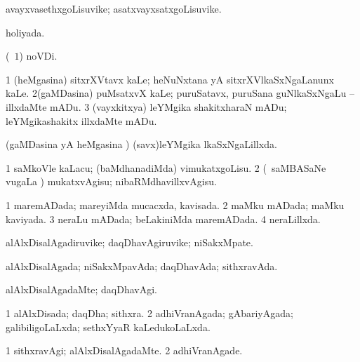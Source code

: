 {{\bentry
{} 
\gl{\nA}
\expl{}
\bmng
avayxvasethxgoLisuvike; asatxvayxsatxgoLisuvike. 
\emng
\eentry

\bentry
{} 
\gl{\gu}
\expl{}
\bmng
holiyada. 
\emng
\eentry

\bentry
{}
\gl{\nA}
\expl{}
\bmng
{} (\pagu\ $1$) noVDi. 
\emng
\eentry

\bentry
{} 
\gl{\sakirx}
\expl{}
\bmng
\bnum
\num{1} (heMgasina) sitxrXVtavx kaLe; heNuNxtana yA sitxrXVlkaSxNgaLanunx kaLe. 
\num{2}(gaMDasina) puMsatxvX kaLe; puruSatavx, puruSana guNlkaSxNgaLu -- illxdaMte mADu. 
\num{3} (vayxkitxya) leYMgika shakitxharaN mADu; leYMgikashakitx illxdaMte mADu. 
\enum
\emng
\eentry

\bentry
{} 
\gl{\gu}
\expl{}
\bmng
(gaMDasina yA heMgasina \vi) (savx)leYMgika lkaSxNgaLillxda. 
\emng
\eentry

\bentry
{} 
\gl{\sakirx}
\expl{}
\bmng
\bnum
\num{1} saMkoVle kaLacu; (baMdhanadiMda) vimukatxgoLisu. 
\num{2} (\kanmu\ saMBASaNe \mo vugaLa \vi) mukatxvAgisu; nibaRMdhavillxvAgisu. 
\enum
\emng
\eentry

\bentry
{} 
\gl{\gu}
\expl{}
\bmng
\bnum
\num{1} maremADada; mareyiMda mucacxda, kavisada. 
\num{2} maMku mADada; maMku kaviyada. 
\num{3} neraLu mADada; beLakiniMda maremADada. 
\num{4} neraLillxda. 
\enum
\emng
\eentry

\bentry
{} 
\gl{\nA}
\expl{}
\bmng
alAlxDisalAgadiruvike; daqDhavAgiruvike; niSakxMpate. 
\emng
\eentry

\bentry
{} 
\gl{\gu}
\expl{}
\bmng
alAlxDisalAgada; niSakxMpavAda; daqDhavAda; sithxravAda. 
\emng
\eentry

\bentry
{} 
\gl{\kirxvi}
\expl{}
\bmng
alAlxDisalAgadaMte; daqDhavAgi. 
\emng
\eentry

\bentry
{} 
\gl{\gu}
\expl{}
\bmng
\bnum
\num{1} alAlxDisada; daqDha; sithxra. 
\num{2} adhiVranAgada; gAbariyAgada; galibiligoLaLxda; sethxYyaR kaLedukoLaLxda. 
\enum
\emng
\eentry

\bentry
{} 
\gl{\kirxvi}
\expl{}
\bmng
\bnum
\num{1} sithxravAgi; alAlxDisalAgadaMte. 
\num{2} adhiVranAgade. 
\enum
\emng
\eentry

}}
